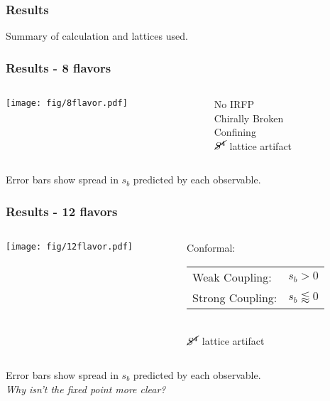   \begin{frame}
    \frametitle{Results}
    Summary of calculation and lattices used.
  \end{frame}

  \begin{frame}
    \frametitle{Results - 8 flavors}
    \begin{columns}[T]
      \begin{column}{.6\textwidth}
        \texttt{[image: fig/8flavor.pdf]}
      \end{column}
      \begin{column}{.4\textwidth}
        No IRFP\\
        Chirally Broken\\
        Confining\\
        \vspace{48pt}
        $\ensuremath{\cancel{S^4}}$ lattice artifact
      \end{column}
    \end{columns}
    \vspace{12pt}
    Error bars show spread in $s_b$ predicted by each observable.
  \end{frame}

  \begin{frame}
    \frametitle{Results - 12 flavors}
    \begin{columns}[T]
      \begin{column}{.6\textwidth}
        \texttt{[image: fig/12flavor.pdf]}
      \end{column}
      \begin{column}{.4\textwidth}
        Conformal:\\
        \vspace{12pt}
        \begin{tabular}{l l}
          Weak Coupling: & $s_b>0$ \\
          Strong Coupling: & $s_b\lessapprox0$\\
        \end{tabular}
        \newline\\
        \vspace{24pt}
        $\ensuremath{\cancel{S^4}}$ lattice artifact
      \end{column}
    \end{columns}
    \vspace{12pt}
    Error bars show spread in $s_b$ predicted by each observable.\\
    \vspace{12pt}
    \emph{Why isn't the fixed point more clear?}
  \end{frame}

